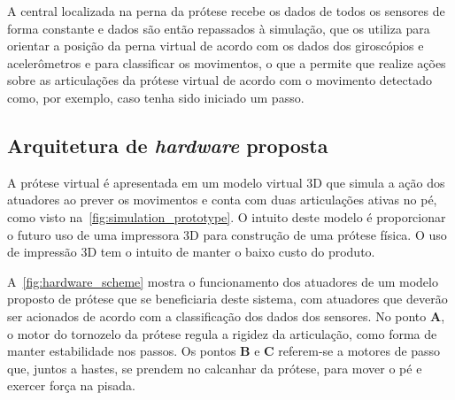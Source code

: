 A central localizada na perna da prótese recebe os dados de todos os sensores de forma constante e dados são então repassados à simulação, que os utiliza para orientar a posição da perna virtual de acordo com os dados dos giroscópios e acelerômetros e para classificar os movimentos, o que a permite que realize ações sobre as articulações da prótese virtual de acordo com o movimento detectado como, por exemplo, caso tenha sido iniciado um passo.

% 

\subsection{Arquitetura de \textit{hardware} proposta}\label{sec:metodo_prot_hardware}
A prótese virtual é apresentada em um modelo virtual 3D que simula a ação dos atuadores ao prever os movimentos e conta com duas articulações ativas no pé, como visto na~\autoref{fig:simulation_prototype}. O intuito deste modelo é proporcionar o futuro uso de uma impressora 3D para construção de uma prótese física. O uso de impressão 3D tem o intuito de manter o baixo custo do produto.

A~\autoref{fig:hardware_scheme} mostra o funcionamento dos atuadores de um modelo proposto de prótese que se beneficiaria deste sistema, com atuadores que deverão ser acionados de acordo com a classificação dos dados dos sensores. No ponto \textbf{A}, o motor do tornozelo da prótese regula a rigidez da articulação, como forma de manter estabilidade nos passos. Os pontos \textbf{B} e \textbf{C} referem-se a motores de passo que, juntos a hastes, se prendem no calcanhar da prótese, para mover o pé e exercer força na pisada.

